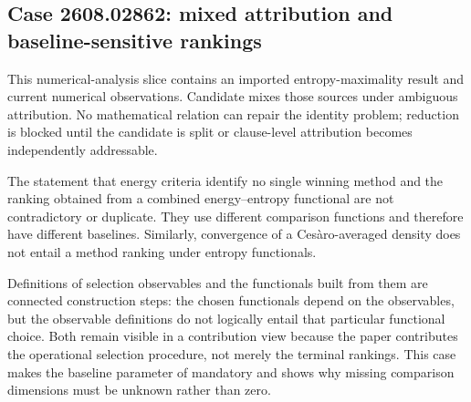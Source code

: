 \subsection{Case 2608.02862: mixed attribution and baseline-sensitive rankings}\label{case:contrib-02862}

This numerical-analysis slice contains an imported entropy-maximality result and current numerical observations. Candidate  mixes those sources under ambiguous attribution. No mathematical relation can repair the identity problem; reduction is blocked until the candidate is split or clause-level attribution becomes independently addressable.

The statement that energy criteria identify no single winning method and the ranking obtained from a combined energy--entropy functional are not contradictory or duplicate. They use different comparison functions and therefore have different baselines. Similarly, convergence of a Ces\`aro-averaged density does not entail a method ranking under entropy functionals.

Definitions of selection observables and the functionals built from them are connected construction steps: the chosen functionals depend on the observables, but the observable definitions do not logically entail that particular functional choice. Both remain visible in a contribution view because the paper contributes the operational selection procedure, not merely the terminal rankings. This case makes the baseline parameter of \ContributionProfile{} mandatory and shows why missing comparison dimensions must be unknown rather than zero.